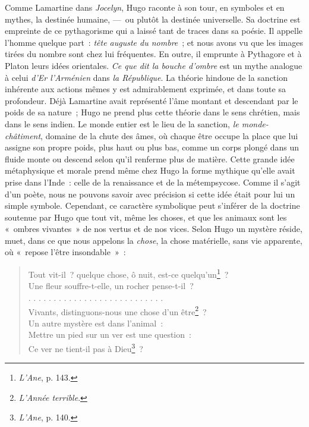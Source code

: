 \documentclass[french,twoside]{book} %
\begin{document}
\noindent Comme Lamartine dans \emph{Jocelyn}, Hugo raconte à son tour, en symboles et en mythes, la destinée humaine, — ou plutôt la destinée universelle. Sa doctrine est empreinte de ce pythagorisme qui a laissé tant de traces dans sa poésie. Il appelle l’homme quelque part : \emph{tête auguste du nombre} ; et nous avons vu que les images tirées du nombre sont chez lui fréquentes. En outre, il emprunte à Pythagore et à Platon leurs idées orientales. \emph{Ce que dit la bouche d’ombre} est un mythe analogue à celui \emph{d’Er l’Arménien} dans \emph{la République}. La théorie hindoue de la sanction inhérente aux actions mêmes y est admirablement exprimée, et dans toute sa profondeur. Déjà Lamartine avait représenté l’âme montant et descendant par le poids de sa nature ; Hugo ne prend plus cette théorie dans le sens chrétien, mais dans le sens indien. Le monde entier est le lieu de la sanction, \emph{le monde-châtiment}, domaine de la chute des âmes, où chaque être occupe la place que lui assigne son propre poids, plus haut ou plus bas, comme un corps plongé dans un fluide monte ou descend selon qu’il renferme plus de matière. Cette grande idée métaphysique et morale prend même chez Hugo la forme mythique qu’elle avait prise dans l’Inde : celle de la renaissance et de la métempsycose. Comme il s’agit d’un poète, nous ne pouvons savoir avec précision si cette idée était pour lui un simple symbole. Cependant, ce caractère symbolique peut s’inférer de la doctrine soutenue par Hugo que tout vit, même les choses, et que les animaux sont les « ombres vivantes » de nos vertus et de nos vices. Selon Hugo un mystère réside, muet, dans ce que nous appelons la \emph{chose}, la chose matérielle, sans vie apparente, où « repose l’être insondable » :\par


\begin{verse}
Tout vit-il ? quelque chose, ô nuit, est-ce quelqu’un\footnote{\emph{L’Ane}, p. 143.} ?\\
Une fleur souffre-t-elle, un rocher pense-t-il ?\\
. . . . . . . . . . . . . . . . . . . . . . . . . . .\\
Vivants, distinguons-nous une chose d’un être\footnote{\emph{L’Année terrible}.} ?\\
Un autre mystère est dans l’animal :\\
Mettre un pied sur un ver est une question :\\
Ce ver ne tient-il pas à Dieu\footnote{\emph{L’Ane}, p. 140.} ?\\
\end{verse}
\end{document}
